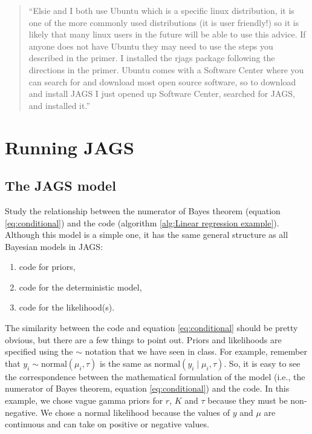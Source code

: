 \documentclass[12pt,english]{article}
\begin{document}
\begin{quotation}
``Elsie and I both use Ubuntu which is a specific linux distribution, it is one of the more commonly used distributions (it is user friendly!) so it is likely that many linux users in the future will be able to use this advice. If anyone does not have Ubuntu they may need to use the steps you described in the primer. I installed the rjags package following the directions in the primer. Ubuntu comes with a Software Center where you can search for and download most open source software, so to download and install JAGS I just opened up Software Center, searched for JAGS, and installed it.''
\end{quotation}

\section{Running JAGS}

\subsection{The JAGS model}

Study the relationship between the numerator of Bayes theorem (equation \ref{eq:conditional}) and the code (algorithm \ref{alg:Linear regression example}). Although this model is a simple one, it has the same general structure as all Bayesian models in JAGS:

\begin{enumerate}
\item code for priors,
\item code for the deterministic model,
\item code for the likelihood(s).
\end{enumerate}

The similarity between the code and equation \ref{eq:conditional} should be pretty obvious, but there are a few things to point out. Priors and likelihoods are specified using the $\sim$ notation that we have seen in class. For example, remember that $y_{i}  \sim  \textrm{normal}\left(\mu_{i},\tau\right)$ is the same as $\textrm{normal}\left(y_{i}\mid\mu_{i},\tau\right)$. So, it is easy to see the correspondence between the mathematical formulation of the model (i.e., the numerator of Bayes theorem, equation \ref{eq:conditional}) and the code. In this example, we chose vague gamma priors for $r$, $K$ and $\tau$ because they must be non-negative. We chose a normal likelihood because the values of $y$ and $\mu$ are continuous and can take on positive or negative values. 
\end{document}
